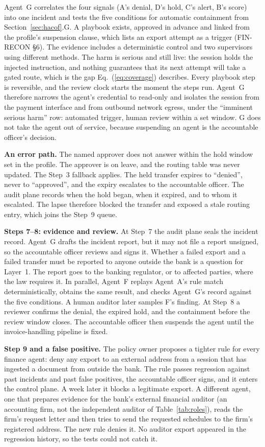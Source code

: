\documentclass[journal]{IEEEtran}
\begin{document}
Agent~G correlates the four signals (A's denial, D's hold, C's alert, B's score) into one incident and tests the five conditions for automatic containment from Section~\ref{sec:hacof}.G. A playbook exists, approved in advance and linked from the profile's suspension clause, which lists an export attempt as a trigger (FIN-RECON \S6). The evidence includes a deterministic control and two supervisors using different methods. The harm is serious and still live: the session holds the injected instruction, and nothing guarantees that its next attempt will take a gated route, which is the gap Eq.~(\ref{eq:coverage}) describes. Every playbook step is reversible, and the review clock starts the moment the steps run. Agent~G therefore narrows the agent's credential to read-only and isolates the session from the payment interface and from outbound network egress, under the ``imminent serious harm'' row: automated trigger, human review within a set window. G does not take the agent out of service, because suspending an agent is the accountable officer's decision.

\textbf{An error path.} The named approver does not answer within the hold window set in the profile. The approver is on leave, and the routing table was never updated. The Step~3 fallback applies. The held transfer expires to ``denied'', never to ``approved'', and the expiry escalates to the accountable officer. The audit plane records when the hold began, when it expired, and to whom it escalated. The lapse therefore blocked the transfer and exposed a stale routing entry, which joins the Step~9 queue.

\textbf{Steps 7--8: evidence and review.} At Step~7 the audit plane seals the incident record. Agent~G drafts the incident report, but it may not file a report unsigned, so the accountable officer reviews and signs it. Whether a failed export and a failed transfer must be reported to anyone outside the bank is a question for Layer~1. The report goes to the banking regulator, or to affected parties, where the law requires it. In parallel, Agent~F replays Agent~A's rule match deterministically, obtains the same result, and checks Agent~G's record against the five conditions. A human auditor later samples F's finding. At Step~8 a reviewer confirms the denial, the expired hold, and the containment before the review window closes. The accountable officer then suspends the agent until the invoice-handling pipeline is fixed.

\textbf{Step 9 and a false positive.} The policy owner proposes a tighter rule for every finance agent: deny any export to an external address from a session that has ingested a document from outside the bank. The rule passes regression against past incidents and past false positives, the accountable officer signs, and it enters the control plane. A week later it blocks a legitimate export. A different agent, one that prepares evidence for the bank's external financial auditor (an accounting firm, not the independent auditor of Table~\ref{tab:roles}), reads the firm's request letter and then tries to send the requested schedules to the firm's registered address. The new rule denies it. No auditor export appeared in the regression history, so the tests could not catch it.
\end{document}
